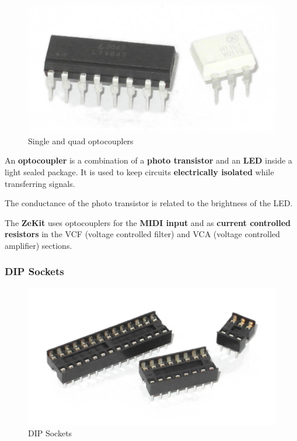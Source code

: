 \documentclass{scrartcl}
\begin{document}
\begin{figure}[!ht]
    \begin{center}
        \includegraphics[scale=0.20]{assets/zekit-optocouplers.jpg}
        \caption{Single and quad optocouplers}
    \end{center}
\end{figure}

An \textbf{optocoupler} is a combination of a \textbf{photo transistor} and an \textbf{LED} inside a light sealed package. It is used to keep circuits \textbf{electrically isolated} while transferring signals.

The conductance of the photo transistor is related to the brightness of the LED.

The \textbf{ZeKit} uses optocouplers for the \textbf{MIDI input} and as \textbf{current controlled resistors} in the VCF (voltage controlled filter) and VCA (voltage controlled amplifier) sections.

\pagebreak
\subsubsection{DIP Sockets}

\begin{figure}[!ht]
    \begin{center}
        \includegraphics[scale=0.20]{assets/zekit-sockets.jpg}
        \caption{DIP Sockets}
    \end{center}
\end{figure}
\end{document}
